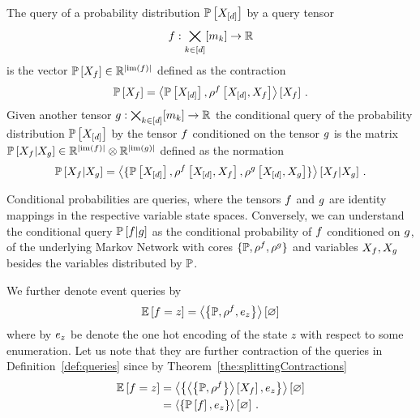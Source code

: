 \begin{definition}\label{def:queries}
	The query of a probability distribution $\mathbb{P}\left[X_{[d]}\right]$ by a query tensor 
		\[ f : \bigtimes_{k\in[d]}[m_{k}] \rightarrow \mathbb{R} \]
	is the vector $\mathbb{P}\left[X_{f}\right] \in \mathbb{R}^{\left|\mathrm{im}\left(f\right)\right|}$ defined as the contraction
	\begin{align*}
		\mathbb{P}\left[X_{f}\right] = \left\langle \mathbb{P}\left[X_{[d]}\right],\rho^{f}\left[X_{[d]},X_{f}\right]\right\rangle \left[ X_{f} \right] \, . 
	\end{align*}
	Given another tensor $g: \bigtimes_{k\in[d]}[m_{k}] \rightarrow \mathbb{R} $ the conditional query of the probability distribution $\mathbb{P}\left[X_{[d]}\right]$ by the tensor $f$ conditioned on the tensor $g$ is the matrix $\mathbb{P}\left[X_{f}|X_{g}\right]\in\mathbb{R}^{\left|\mathrm{im}\left(f\right)\right|}\otimes \mathbb{R}^{\left|\mathrm{im}\left(g\right)\right|}$ defined as the normation
	\begin{align*}
		\mathbb{P}\left[X_{f}|X_{g}\right] 
		= \left\langle \{
		\mathbb{P}\left[X_{[d]}\right],\rho^{f}\left[X_{[d]},X_{f}\right],\rho^{g}\left[X_{[d]},X_{g}\right]
		\}\right\rangle \left[ 
		X_{f} | X_{g}
		 \right] \, . 
	\end{align*}
\end{definition}

Conditional probabilities are queries, where the tensors $f$ and $g$ are identity mappings in the respective variable state spaces.
Conversely, we can understand the conditional query $\mathbb{P}\left[f|g\right]$ as the conditional probability of $f$ conditioned on $g$, of the underlying Markov Network with cores $\{\mathbb{P}, \rho^{f}, \rho^{g} \}$ and variables $X_{f},X_{g}$ besides the variables distributed by $\mathbb{P}$.

We further denote event queries by
	\[  \mathbb{E}\left[f=z\right] = \left\langle \left\{\mathbb{P},\rho^{f},e_{z}\right\}\right\rangle \left[ \varnothing \right] \]
where by $e_{z}$ be denote the one hot encoding of the state $z$ with respect to some enumeration.
Let us note that they are further contraction of the queries in Definition~\ref{def:queries} since by Theorem~\ref{the:splittingContractions}
\begin{align*}
	 \mathbb{E}\left[f=z\right] 
	& =  \left\langle \left\{ \left\langle \left\{\mathbb{P},\rho^{f}\right\}\right\rangle \left[ X_{f} \right] ,e_{z}\right\}\right\rangle \left[ \varnothing \right] \\
	& =  \left\langle \left\{ \mathbb{P}\left[f\right] ,e_{z}\right\}\right\rangle \left[ \varnothing \right] \, . 
\end{align*}

